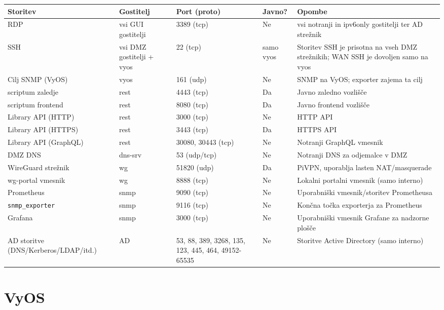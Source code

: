 \documentclass[a4paper,11pt]{article}
\begin{document}
\begin{longtable}{|p{4.1cm}|p{2cm}|p{2.5cm}|p{1.3cm}|p{5.0cm}|}
\hline
\textbf{Storitev} & \textbf{Gostitelj} & \textbf{Port (proto)} & \textbf{Javno?} & \textbf{Opombe} \\
\hline
RDP & vsi GUI gostitelji & 3389 (tcp) & Ne & vsi notranji in ipv6only gostitelji ter AD strežnik \\
\hline
SSH & vsi DMZ gostitelji + vyos & 22 (tcp) & samo vyos & Storitev SSH je prisotna na vseh DMZ strežnikih; WAN SSH je dovoljen samo na vyos \\
\hline
Cilj SNMP (VyOS) & vyos & 161 (udp) & Ne & SNMP na VyOS; exporter zajema ta cilj \\
\hline
scriptum zaledje & rest & 4443 (tcp) & Da & Javno zaledno vozlišče \\
\hline
scriptum frontend & rest & 8080 (tcp) & Da & Javno frontend vozlišče \\
\hline
Library API (HTTP) & rest & 3000 (tcp) & Ne & HTTP API \\
\hline
Library API (HTTPS) & rest & 3443 (tcp) & Da & HTTPS API \\
\hline
Library API (GraphQL) & rest & 30080, 30443 (tcp) & Ne & Notranji GraphQL vmesnik \\
\hline
DMZ DNS & dns-srv & 53 (udp/tcp) & Ne & Notranji DNS za odjemalce v DMZ \\
\hline
WireGuard strežnik & wg & 51820 (udp) & Da & PiVPN, uporablja lasten NAT/masquerade \\
\hline
wg-portal vmesnik & wg & 8888 (tcp) & Ne & Lokalni portalni vmesnik (samo interno) \\
\hline
Prometheus & snmp & 9090 (tcp) & Ne & Uporabniški vmesnik/storitev Prometheusa \\
\hline
\texttt{snmp\_exporter} & snmp & 9116 (tcp) & Ne & Končna točka exporterja za Prometheus \\
\hline
Grafana & snmp & 3000 (tcp) & Ne & Uporabniški vmesnik Grafane za nadzorne plošče \\
\hline
AD storitve (DNS/Kerberos/LDAP/itd.) & AD & 53, 88, 389, 3268, 135, 123, 445, 464, 49152-65535 & Ne & Storitve Active Directory (samo interno) \\
\hline
\end{longtable}

\section{VyOS}
\end{document}
